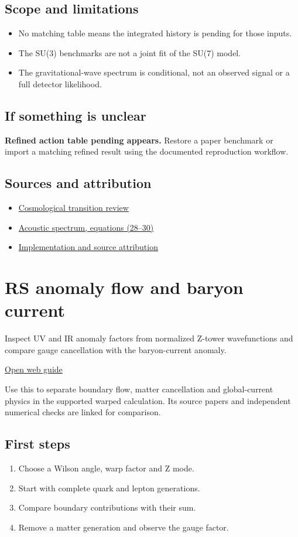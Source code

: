 \documentclass[11pt,a4paper]{article}
\begin{document}
\subsection*{Scope and limitations}
\begin{itemize}
\item No matching table means the integrated history is pending for those inputs.
\item The SU(3) benchmarks are not a joint fit of the SU(7) model.
\item The gravitational-wave spectrum is conditional, not an observed signal or a full detector likelihood.
\end{itemize}
\subsection*{If something is unclear}
\textbf{Refined action table pending appears.} Restore a paper benchmark or import a matching refined result using the documented reproduction workflow.

\subsection*{Sources and attribution}
\begin{itemize}
\item \href{https://arxiv.org/abs/2305.02357}{Cosmological transition review}
\item \href{https://arxiv.org/abs/2309.05474}{Acoustic spectrum, equations (28--30)}
\item \href{https://github.com/karlesmarin/ghu-lab/blob/main/src/modules/thermal_history.mjs}{Implementation and source attribution}
\end{itemize}
\section{RS anomaly flow and baryon current}
Inspect UV and IR anomaly factors from normalized Z-tower wavefunctions and compare gauge cancellation with the baryon-current anomaly.

\href{https://karlesmarin.github.io/ghu-explorer/guide/rsanomaly/index.html}{Open web guide}

Use this to separate boundary flow, matter cancellation and global-current physics in the supported warped calculation. Its source papers and independent numerical checks are linked for comparison.
\subsection*{First steps}
\begin{enumerate}
\item Choose a Wilson angle, warp factor and Z mode.
\item Start with complete quark and lepton generations.
\item Compare boundary contributions with their sum.
\item Remove a matter generation and observe the gauge factor.
\end{enumerate}
\end{document}

